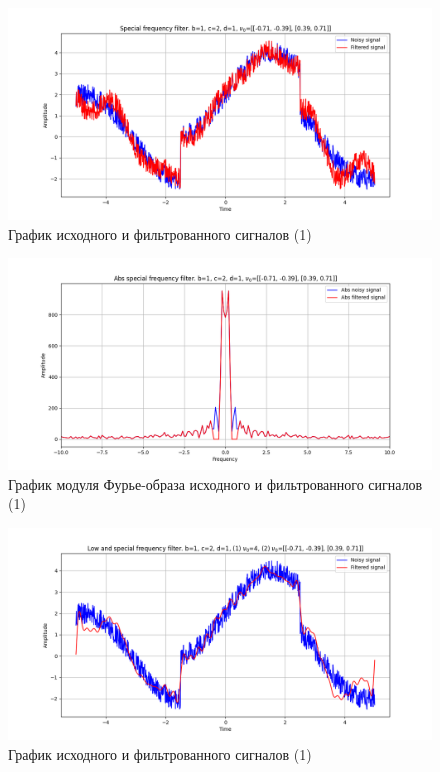 \documentclass[a4paper, 12pt]{article}
\begin{document}
    \begin{figure}[!htb]
        \centering
        \includegraphics[scale=0.48]{1_u_flt_u_nospec.png}
        \captionsetup{skip=0pt}
        \caption{График исходного и фильтрованного сигналов (1)}
        \label{fig:fig71}
    \end{figure}
    \begin{figure}[!htb]
        \centering
        \includegraphics[scale=0.48]{1_abs_u_U_nospec.png}
        \captionsetup{skip=0pt}
        \caption{График модуля Фурье-образа исходного и фильтрованного сигналов (1)}
        \label{fig:fig72}
    \end{figure}
    \begin{figure}[!htb]
        \centering
        \includegraphics[scale=0.48]{1_3_u_flt_u_nospec.png}
        \captionsetup{skip=0pt}
        \caption{График исходного и фильтрованного сигналов (1)}
        \label{fig:fig77}
    \end{figure}
\end{document}
